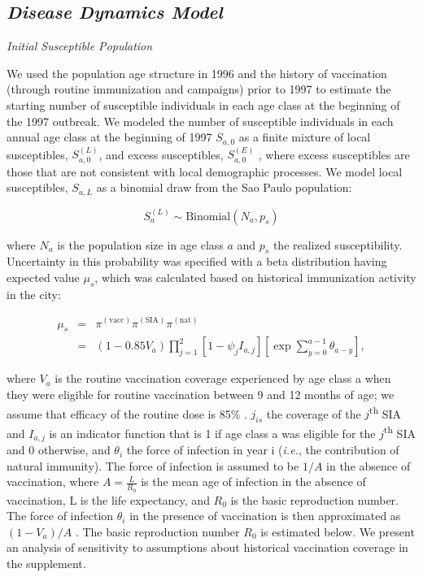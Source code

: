 \subsection{\texorpdfstring{\emph{Disease Dynamics
Model}}{Disease Dynamics Model}}\label{disease-dynamics-model}

\emph{Initial Susceptible Population}

We used the population age structure in 1996 and the history of vaccination (through routine immunization and campaigns) prior to 1997 to estimate the starting number of susceptible individuals in each age class at the beginning of the 1997 outbreak.  We modeled the number of susceptible individuals in each annual age class at the beginning of 1997 \(S_{a,0}\) as a finite mixture of local susceptibles, \(S_{a,0}^{(L)}\), and excess susceptibles, \(S_{a,0}^{(E)}\) , where excess susceptibles are those that are not consistent with local demographic processes.  We model local susceptibles, \(S_{a,L}\) as a binomial draw from the Sao Paulo population:

\[S_a^{(L)} \sim \text{Binomial}(N_a, p_s)\]

where \(N_a\) is the population size in age class \(a\) and \(p_s\) the realized susceptibility. Uncertainty in this probability was specified with a beta distribution having expected value \(\mu_s\), which was calculated based on historical immunization activity in the city:

\begin{eqnarray}
\mu_s &=& \pi^{(\text{vacc})} \pi^{(\text{SIA})}\pi^{(\text{nat})} \\
&=& (1- 0.85 V_a) \prod_{j=1}^2 \left[1- \psi_j I_{a,j} \right] \left[\exp \sum_{y=0}^{a-1} \theta_{a-y} \right],
\end{eqnarray}

where \(V_a\) is the routine vaccination coverage experienced by age class a when they were eligible for routine vaccination between 9 and 12 months of age; we assume that efficacy of the routine dose is 85\% \cite{Uzicanin_2011}.  \(j_{is}\) the coverage of the \(j\)\textsuperscript{th} SIA and \(I_{a,j}\) is an indicator function that is 1 if age class a was eligible for the \(j\)\textsuperscript{th} SIA and 0 otherwise, and \(\theta_i\) the force of infection in year i (\emph{i.e.}, the contribution of natural immunity).  The force of infection is assumed to be \(1/A\) in the absence of vaccination, where \(A=\frac{L}{R_0}\) \cite{Anderson_1981} is the mean age of infection in the absence of vaccination, L is the life expectancy, and \(R_0\) is the basic reproduction number. The force of infection \(\theta_i\) in the presence of vaccination is then approximated as \((1-V_a)/A\) \cite{Anderson_1981}.  The basic reproduction number \(R_0\) is estimated below.  We present an analysis of sensitivity to assumptions about historical vaccination coverage in the supplement.

